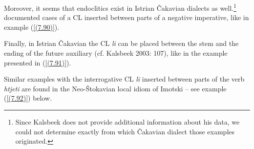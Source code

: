 
\noindent Moreover, it seems that endoclitics exist in Istrian Čakavian dialects as well.\footnote{Since Kalsbeek does not provide additional information about his data, we could not determine exactly from which Čakavian dialect those examples originated. } \citet[107]{Kalsbeek03} documented cases of a CL inserted between parts of a negative imperative, like in example (\ref{(7.90)}). 


\noindent Finally, in Istrian Čakavian the CL \textit{li} can be placed between the stem and the ending of the future auxiliary (cf. Kalsbeek 2003: 107), like in the example presented in (\ref{(7.91)}).


\noindent Similar examples with the interrogative CL \textit{li} inserted between parts of the verb \textit{htjeti} are found in the Neo-Štokavian local idiom of Imotski – see example (\ref{(7.92)}) below.



